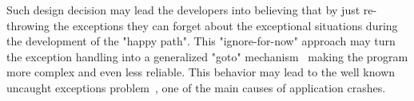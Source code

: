 \documentclass[conference]{IEEEtran}
\begin{document}
Such design decision may lead the developers into believing that by just re-throwing 
the exceptions they can forget about the exceptional situations during the development of the "happy path". 
This "ignore-for-now" approach may turn the exception handling into a generalized "goto" mechanism~\cite{mandrioli1992advances}
 making the program more complex and even less reliable. This behavior may lead to the well known uncaught exceptions 
problem~\cite{jo2004uncaught}, one of the main causes of application crashes.  




\end{document}
